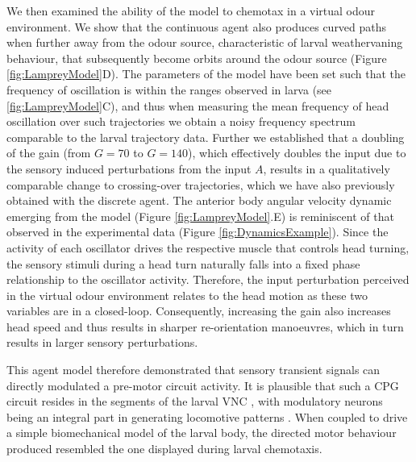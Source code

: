 \documentclass[11pt,a4paper]{article}
\begin{document}

We then examined the ability of the model to chemotax in a virtual odour environment. We show that the continuous agent also produces curved paths when further away from the odour source, characteristic of larval weathervaning behaviour, that subsequently become orbits around the odour source (Figure \ref{fig:LampreyModel}D). The parameters of the model have been set such that the frequency of oscillation is within the ranges observed in larva (see \ref{fig:LampreyModel}C), and thus when measuring the mean frequency of head oscillation over such trajectories we obtain a noisy frequency spectrum comparable to the larval trajectory data. Further we established that a doubling of the gain (from $G=70$ to $G=140$), which effectively doubles the input due to the sensory induced perturbations from the input $A$, results in a qualitatively comparable change to crossing-over trajectories, which we have also previously obtained with the discrete agent. The anterior body angular velocity dynamic emerging from the model (Figure \ref{fig:LampreyModel}.E) is reminiscent of that observed in the experimental data (Figure \ref{fig:DynamicsExample}).
Since the activity of each oscillator drives the respective muscle that controls head turning, the sensory stimuli during a head turn naturally falls into a fixed phase relationship to the oscillator activity. Therefore, the input perturbation perceived in the virtual odour environment relates to the head motion as these two variables are in a closed-loop. 
Consequently, increasing the gain also increases head speed and thus results in sharper re-orientation manoeuvres, which in turn results in larger sensory perturbations.
 
This agent model therefore demonstrated that sensory transient signals can  directly modulated a pre-motor circuit activity. It is plausible that such a CPG circuit resides in the segments of the larval VNC \citep{kohsaka2012development}, with modulatory neurons being an integral part in generating locomotive patterns \citep{suster2003targeted}. When coupled to drive a simple biomechanical model of the larval body, the directed motor behaviour produced resembled the one displayed during larval chemotaxis.
\end{document}
